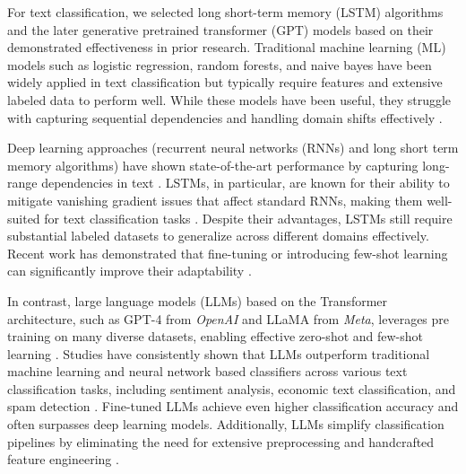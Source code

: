 %
%
For text classification, we selected long short-term memory (LSTM) algorithms and the later generative pretrained transformer (GPT) models based on their demonstrated effectiveness in prior research. Traditional machine learning (ML) models such as logistic regression, random forests, and naive bayes have been widely applied in text classification but typically require features and extensive labeled data to perform well. While these models have been useful, they struggle with capturing sequential dependencies and handling domain shifts effectively \cite{sarker2021machine}.

Deep learning approaches (recurrent neural networks (RNNs) and long short term memory algorithms) have shown state-of-the-art performance by capturing long-range dependencies in text \cite{sutskever2014sequence}. LSTMs, in particular, are known for their ability to mitigate vanishing gradient issues that affect standard RNNs, making them well-suited for text classification tasks \cite{hochreiter1997long}. Despite their advantages, LSTMs still require substantial labeled datasets to generalize across different domains effectively. Recent work has demonstrated that fine-tuning or introducing few-shot learning can significantly improve their adaptability \cite{jamshidi2024effective}.

In contrast, large language models (LLMs) based on the Transformer architecture, such as GPT-4 from \textit{OpenAI} and LLaMA from \textit{Meta}, leverages pre training on many diverse datasets, enabling effective zero-shot and few-shot learning \cite{brown2020language, touvron2023llama}. Studies have consistently shown that LLMs outperform traditional machine learning and neural network based classifiers across various text classification tasks, including sentiment analysis, economic text classification, and spam detection \cite{moller2024parrot, betianu2024dallmi}. Fine-tuned LLMs achieve even higher classification accuracy and often surpasses deep learning models. Additionally, LLMs simplify classification pipelines by eliminating the need for extensive preprocessing and handcrafted feature engineering \cite{oh2024language}.

